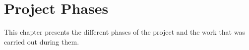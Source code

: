 \chapter{Project Phases}
	
	This chapter presents the different phases of the project and the work that was carried out 
	during them.